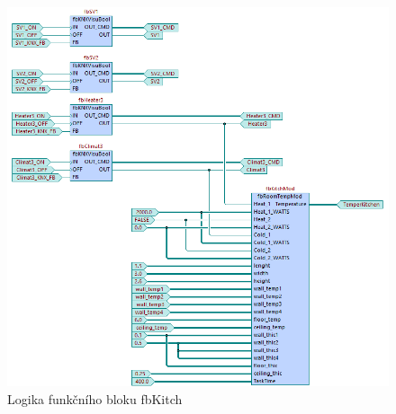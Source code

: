 \begin{figure}[!ht]
  \begin{center}
  \includegraphics[scale=0.7]{obrazky/fbKitch.png}
  \end{center}
  \caption[Logika funkčního bloku fbKitch]{Logika funkčního bloku fbKitch}
  \label{fig:fbKitch}
\end{figure}
\pagebreak
